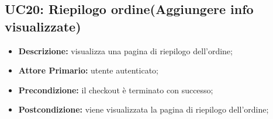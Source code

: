 \subsection{UC20: Riepilogo ordine(\textbf{Aggiungere info visualizzate})}
\label{sec:UC20}
\begin{itemize}
    \item \textbf{Descrizione:} visualizza una pagina di riepilogo dell'ordine;
    \item \textbf{Attore Primario:} utente autenticato;
    \item \textbf{Precondizione:} il checkout è terminato con successo;
    \item \textbf{Postcondizione:} viene visualizzata la pagina di riepilogo dell'ordine;
\end{itemize}
